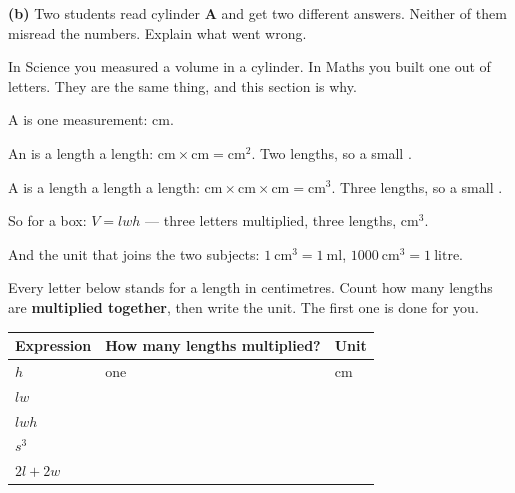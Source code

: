 \documentclass[12pt,a4paper]{article}
\newcommand{\qlines}[1]{\par\needspace{\numexpr#1+1\relax\baselineskip}\wlines{#1}}
\begin{document}
\vspace{10pt}
\noindent \textbf{(b)} Two students read cylinder \textbf{A} and get two different
answers. Neither of them misread the numbers. Explain what went wrong.
\qlines{2}


\noindent In Science you measured a volume in a cylinder. In Maths you built one out
of letters. They are the same thing, and this section is why.

\begin{remember}
  A  is one measurement: \; $\mathrm{cm}$.

  \smallskip
  An  is a length  a length: \; $\mathrm{cm} \times
  \mathrm{cm} = \mathrm{cm^2}$. \; Two lengths, so a small .

  \smallskip
  A  is a length  a length  a length: \;
  $\mathrm{cm} \times \mathrm{cm} \times \mathrm{cm} = \mathrm{cm^3}$. \; Three
  lengths, so a small .

  \medskip
  So for a box: \qquad $V = lwh$ \qquad --- three letters multiplied, three
  lengths, $\mathrm{cm^3}$.

  \medskip
  And the unit that joins the two subjects:\qquad
  $1\ \mathrm{cm^3} = 1\ \mathrm{ml}$, \qquad
  $1000\ \mathrm{cm^3} = 1\ \mathrm{litre}$.
\end{remember}


\noindent Every letter below stands for a length in centimetres. Count how many
lengths are \textbf{multiplied together}, then write the unit. \; The first one is done
for you.

\vspace{7pt}
\noindent
\begin{tabularx}{\textwidth}{|p{3.4cm}|X|p{2.6cm}|}
  \hline
  \textbf{Expression} & \textbf{How many lengths multiplied?} & \textbf{Unit} \\
  \hline
  $h$ \rule[-0.65em]{0pt}{2.0em}       & one & $\mathrm{cm}$ \\ \hline
  $lw$ \rule[-0.65em]{0pt}{2.0em}      & & \\ \hline
  $lwh$ \rule[-0.65em]{0pt}{2.0em}     & & \\ \hline
  $s^3$ \rule[-0.65em]{0pt}{2.0em}     & & \\ \hline
  $2l + 2w$ \rule[-0.65em]{0pt}{2.0em} & & \\ \hline
\end{tabularx}
\end{document}
